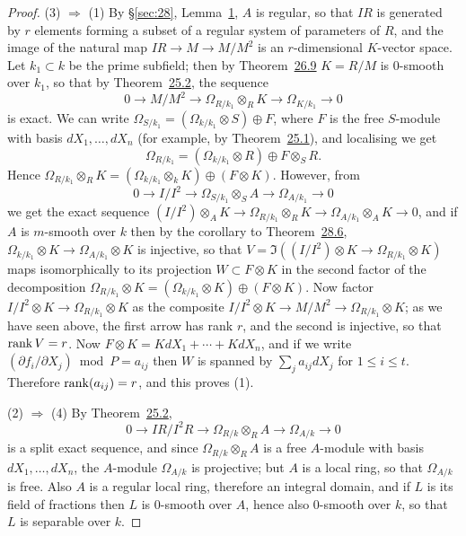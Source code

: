 \begin{proof}
(3) $\Rightarrow$ (1) By \S\ref{sec:28}, Lemma~\hyperref[lem:28.1]{1}, $A$ is regular, so that $IR$ is generated by
$r$ elements forming a subset of a regular system of parameters of $R$, and the
image of the natural map $IR \to M \to M/M^2$ is an $r$-dimensional $K$-vector space.
Let $k_1 \subset k$ be the prime subfield; then by
Theorem~\hyperref[thm:26.9]{26.9} $K = R/M$ is 0-smooth over $k_1$, so that by
Theorem~\hyperref[thm:25.2]{25.2}, the sequence
\[
  0 \to M/M^2 \to \Omega_{R/k_1} \otimes_R K \to \Omega_{K/k_1} \to 0
\]
is exact. We can write $\Omega_{S/k_1} = (\Omega_{k/k_1} \otimes S) \oplus F$, where $F$ is the free
$S$-module with basis $dX_1, \ldots, dX_n$ (for example, by
Theorem~\hyperref[thm:25.1]{25.1}), and localising we get
\[
  \Omega_{R/k_1} = (\Omega_{k/k_1} \otimes R) \oplus F \otimes_S R.
\]
Hence $\Omega_{R/k_1} \otimes_R K = (\Omega_{k/k_1} \otimes_k K) \oplus (F \otimes K)$. However, from
\[
  0 \to I/I^2 \to \Omega_{S/k_1} \otimes_S A \to \Omega_{A/k_1} \to 0
\]
we get the exact sequence $(I/I^2) \otimes_A K \to \Omega_{R/k_1} \otimes_R K \to
\Omega_{A/k_1} \otimes_A K \to 0$, and if $A$ is $m$-smooth over $k$ then by the corollary to
Theorem~\hyperref[thm:28.6]{28.6}, $\Omega_{k/k_1} \otimes K \to \Omega_{A/k_1} \otimes K$ is injective, so that
$V = \Im((I/I^2) \otimes K \to \Omega_{R/k_1} \otimes K)$ maps isomorphically to its
projection $W \subset F \otimes K$ in the second factor of the decomposition
$\Omega_{R/k_1} \otimes K = (\Omega_{k/k_1} \otimes K) \oplus (F \otimes K)$. Now factor
$I/I^2 \otimes K \to \Omega_{R/k_1} \otimes K$ as the composite
$I/I^2 \otimes K \to M/M^2 \to \Omega_{R/k_1} \otimes K$; as we have seen above, the first arrow
has rank $r$, and the second is injective, so that $\operatorname{rank} V = r$. Now
$F \otimes K = KdX_1 + \cdots + KdX_n$, and if we write
$(\partial f_i/\partial X_j) \bmod P = a_{ij}$ then $W$ is spanned by $\sum_j a_{ij}dX_j$ for
$1 \le i \le t$. Therefore $\operatorname{rank}(a_{ij}) = r$, and this proves (1).

(2) $\Rightarrow$ (4) By Theorem~\hyperref[thm:25.2]{25.2},
\[
  0 \to IR/I^2R \to \Omega_{R/k} \otimes_R A \to \Omega_{A/k} \to 0
\]
is a split exact sequence, and since $\Omega_{R/k} \otimes_R A$ is a free $A$-module with basis
$dX_1, \ldots, dX_n$, the $A$-module $\Omega_{A/k}$ is projective; but $A$ is a local ring, so
that $\Omega_{A/k}$ is free. Also $A$ is a regular local ring, therefore an integral
domain, and if $L$ is its field of fractions then $L$ is 0-smooth over $A$, hence also
0-smooth over $k$, so that $L$ is separable over $k$.


\end{proof}
